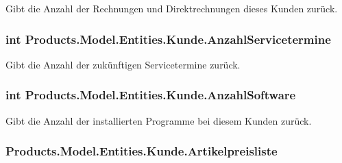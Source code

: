 Gibt die Anzahl der Rechnungen und Direktrechnungen dieses Kunden zurück. 

\subsubsection[{\texorpdfstring{Anzahl\+Servicetermine}{AnzahlServicetermine}}]{\setlength{\rightskip}{0pt plus 5cm}int Products.\+Model.\+Entities.\+Kunde.\+Anzahl\+Servicetermine\hspace{0.3cm}{\ttfamily [get]}}\hypertarget{class_products_1_1_model_1_1_entities_1_1_kunde_a1c6eafef85cdc0cff21c272ba1b80a0d}{}\label{class_products_1_1_model_1_1_entities_1_1_kunde_a1c6eafef85cdc0cff21c272ba1b80a0d}


Gibt die Anzahl der zukünftigen Servicetermine zurück. 

\subsubsection[{\texorpdfstring{Anzahl\+Software}{AnzahlSoftware}}]{\setlength{\rightskip}{0pt plus 5cm}int Products.\+Model.\+Entities.\+Kunde.\+Anzahl\+Software\hspace{0.3cm}{\ttfamily [get]}}\hypertarget{class_products_1_1_model_1_1_entities_1_1_kunde_af59d33e730a7082f6691e6530525ebc5}{}\label{class_products_1_1_model_1_1_entities_1_1_kunde_af59d33e730a7082f6691e6530525ebc5}


Gibt die Anzahl der installierten Programme bei diesem Kunden zurück. 

\subsubsection[{\texorpdfstring{Artikelpreisliste}{Artikelpreisliste}}]{ Products.\+Model.\+Entities.\+Kunde.\+Artikelpreisliste\hspace{0.3cm}{\ttfamily [get]}}\hypertarget{class_products_1_1_model_1_1_entities_1_1_kunde_aa0491591c035906cadc24896793c7ff5}{}\label{class_products_1_1_model_1_1_entities_1_1_kunde_aa0491591c035906cadc24896793c7ff5}


